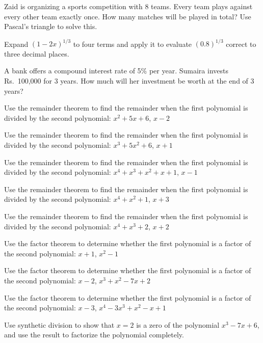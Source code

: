 \documentclass[11pt,a4paper]{article}
\begin{document}
\begin{longlist}
\item Zaid is organizing a sports competition with 8 teams. Every team plays against every other team exactly once. How many matches will be played in total? Use Pascal's triangle to solve this.

\item Expand $(1-2x)^{1/3}$ to four terms and apply it to evaluate $(0.8)^{1/3}$ correct to three decimal places.

\item A bank offers a compound interest rate of 5\% per year. Sumaira invests Rs.\ 100,000 for 3 years. How much will her investment be worth at the end of 3 years?

\item Use the remainder theorem to find the remainder when the first polynomial is divided by the second polynomial: $x^2+5x+6$, $x-2$

\item Use the remainder theorem to find the remainder when the first polynomial is divided by the second polynomial: $x^3+5x^2+6$, $x+1$

\item Use the remainder theorem to find the remainder when the first polynomial is divided by the second polynomial: $x^4+x^3+x^2+x+1$, $x-1$

\item Use the remainder theorem to find the remainder when the first polynomial is divided by the second polynomial: $x^4+x^2+1$, $x+3$

\item Use the remainder theorem to find the remainder when the first polynomial is divided by the second polynomial: $x^4+x^3+2$, $x+2$

\item Use the factor theorem to determine whether the first polynomial is a factor of the second polynomial: $x+1$, $x^2-1$

\item Use the factor theorem to determine whether the first polynomial is a factor of the second polynomial: $x-2$, $x^3+x^2-7x+2$

\item Use the factor theorem to determine whether the first polynomial is a factor of the second polynomial: $x-3$, $x^4-3x^3+x^2-x+1$

\item Use synthetic division to show that $x=2$ is a zero of the polynomial $x^3-7x+6$, and use the result to factorize the polynomial completely.


\end{longlist}
\end{document}
